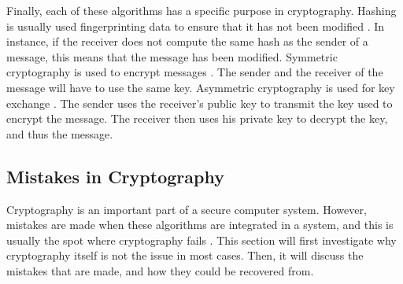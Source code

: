 \documentclass{l4proj}
\begin{document}
Finally, each of these algorithms has a specific purpose in cryptography.
Hashing is usually used fingerprinting data to ensure that it has not been modified \citep{kessler_overview_2016}.
In instance, if the receiver does not compute the same hash as the sender of a message, 
this means that the message has been modified. 
Symmetric cryptography is used to encrypt messages \citep{kessler_overview_2016}. 
The sender and the receiver of the message will have to use the same key.
Asymmetric cryptography is used for key exchange \citep{kessler_overview_2016}.
The sender uses the receiver's public key to transmit the key used to encrypt the message.
The receiver then uses his private key to decrypt the key, and thus the message.

\subsection{Mistakes in Cryptography}

Cryptography is an important part of a secure computer system. However, mistakes are made when these algorithms are integrated in a system,
and this is usually the spot where cryptography fails \citep{lazar_why_nodate}. This section will first investigate why cryptography itself is not the issue in most cases.
Then, it will discuss the mistakes that are made, and how they could be recovered from.
\end{document}
